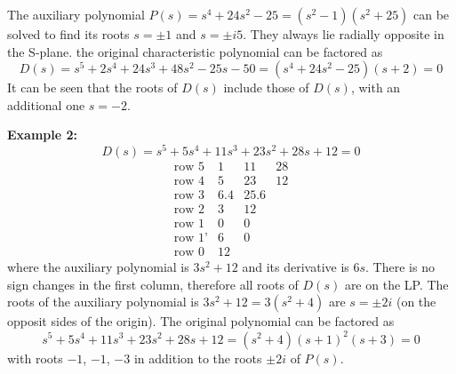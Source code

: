 \documentclass[12pt]{article}
\begin{document}
The auxiliary polynomial $P(s)=s^4+24s^2-25=(s^2-1)(s^2+25)$ can be solved to find its
roots $s=\pm 1$ and $s=\pm i5$. They always lie radially opposite in the S-plane. the 
original characteristic polynomial can be factored as
\[ D(s)=s^5+2s^4+24s^3+48s^2-25s-50=(s^4+24s^2-25)(s+2)=0 \]
It can be seen that the roots of $D(s)$ include those of $D(s)$, with an additional
one $s=-2$.

{\bf Example 2: }
\[ D(s)=s^5+5s^4+11s^3+23s^2+28s+12=0 \]
\[ \begin{array}{lrrr}
\mbox{row 5} & 1 & 11 & 28 \\
\mbox{row 4} & 5 & 23 & 12 \\
\mbox{row 3} & 6.4 & 25.6 &\\
\mbox{row 2} & 3 & 12 &    \\
\mbox{row 1} & 0 & 0  &    \\
\mbox{row 1'}& 6 & 0  &    \\
\mbox{row 0} & 12 &   &    
\end{array} \]
where the auxiliary polynomial is $3s^2+12$ and its derivative is $6s$. There is
no sign changes in the first column, therefore all roots of $D(s)$ are on the LP.
The roots of the auxiliary polynomial is $3s^2+12=3(s^2+4)$ are $s=\pm 2i$ (on the
opposit sides of the origin). The original polynomial can be factored as
\[ s^5+5s^4+11s^3+23s^2+28s+12=(s^2+4)(s+1)^2(s+3)=0 \]
with roots $-1$, $-1$, $-3$ in addition to the roots $\pm 2i$ of $P(s)$.
\end{document}
